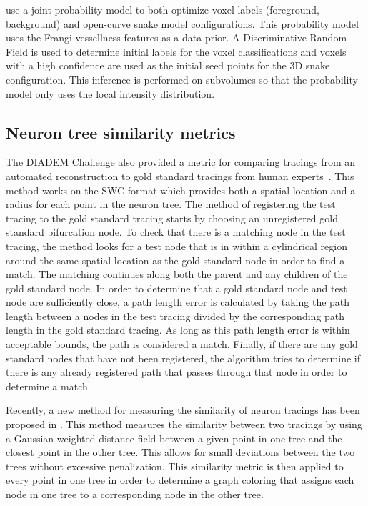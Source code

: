 \Textcite{Gulyanon2015}
 use a joint probability model
to both optimize voxel labels (foreground,
background) and open-curve snake model
configurations. This probability model
uses the Frangi vessellness features as a
data prior. A Discriminative Random
Field is used to determine initial labels
for the voxel classifications and voxels
with a high confidence are used as the 
initial seed points for the 3D snake configuration.
This inference is performed on subvolumes
so that the probability model only uses
the local intensity distribution.

\subsection{Neuron tree similarity metrics}

The DIADEM Challenge also provided a metric for comparing tracings
from an automated reconstruction to gold standard tracings from human
experts~\autocite{DIADEM-metric-Gillette2011,Gillette2015}.
			This method works on the SWC
			format which provides both a spatial
			location and a radius for each point in the
			neuron tree. The method of registering the
			test tracing to the gold standard tracing
			starts by choosing an unregistered gold
			standard bifurcation node. To check that
			there is a matching node in the test
			tracing, the method looks for a test node
			that is in within a cylindrical region
			around the same spatial location as the
			gold standard node in order to find a
			match. The matching continues along both
			the parent and any children of the gold
			standard node. In order to determine that
			a gold standard node and test node are
			sufficiently close, a path length error is
			calculated by taking the path length
			between a nodes in the test tracing
			divided by the corresponding path length
			in the gold standard tracing. As long as
			this path length error is within
			acceptable bounds, the path is considered
			a match. Finally, if there are any gold
			standard nodes that have not been
			registered, the algorithm tries to
			determine if there is any already
			registered path that passes
			through that node in order to determine a
			match.

Recently, a new method for measuring the similarity of neuron
tracings has been proposed in
\autocite{Mayerich2011,Mayerich2012}.
			This method
			measures the similarity between two
			tracings by using a Gaussian-weighted distance
			field between a given point in one tree
			and the closest point in the other
			tree. This allows for small deviations
			between the two trees without excessive
			penalization. This similarity metric is
			then applied to every point in one tree in order
			to determine a graph coloring that assigns
			each node in one tree to a corresponding
			node in the other tree.

